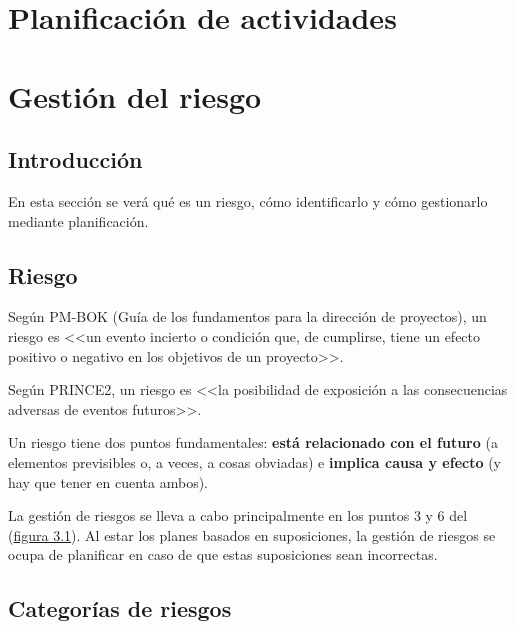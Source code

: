 \documentclass[12pt]{article}
\begin{document}
\newpage
\section{Planificación de actividades}
\label{6.0.0}


\newpage
\section{Gestión del riesgo}
\label{7.0.0}

\subsection{Introducción}
\label{7.1.0}

{En esta sección se verá qué es un riesgo, cómo identificarlo y cómo gestionarlo mediante planificación.}

\subsection{Riesgo}
\label{7.2.0}

{Según PM-BOK (Guía de los fundamentos para la dirección de proyectos), un riesgo es <<un evento incierto o condición que, de cumplirse, tiene un efecto positivo o negativo en los objetivos de un proyecto>>.} \bigskip

{Según PRINCE2, un riesgo es <<la posibilidad de exposición a las consecuencias adversas de eventos futuros>>.} \bigskip

{Un riesgo tiene dos puntos fundamentales: \textbf{está relacionado con el futuro} (a elementos previsibles o, a veces, a cosas obviadas) e \textbf{implica causa y efecto} (y hay que tener en cuenta ambos).} \bigskip

{La gestión de riesgos se lleva a cabo principalmente en los puntos 3 y 6 del  (\hyperref[fig:3.1]{figura 3.1}). Al estar los planes basados en suposiciones, la gestión de riesgos se ocupa de planificar en caso de que estas suposiciones sean incorrectas.}

\subsection{Categorías de riesgos}
\label{7.3.0}
\end{document}
